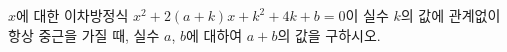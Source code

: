 $x$에 대한 이차방정식 $x^2+2(a+k)x+k^2+4k+b=0$이 실수 $k$의 값에 관계없이 항상 중근을 가질 때, 실수 $a$, $b$에 대하여 $a+b$의 값을 구하시오.
